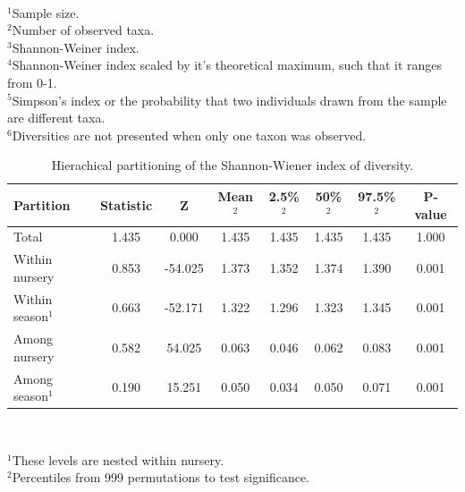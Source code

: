\documentclass[12pt]{article}
\begin{document}
\begin{table}[ht]
\\
\vspace{12pt}
\raggedright
$^{1}$Sample size.\\
$^{2}$Number of observed taxa.\\
$^{3}$Shannon-Weiner index.\\
$^{4}$Shannon-Weiner index scaled by it's theoretical maximum, such that it ranges from 0-1.\\
$^{5}$Simpson's index or the probability that two individuals drawn from the sample are different taxa.\\
$^{6}$Diversities are not presented when only one taxon was observed. \\
\end{table}


\begin{table}[ht]
\centering
\caption{Hierachical partitioning of the Shannon-Wiener index of diversity.} 
\label{tab:adipart}
\begin{tabular}{lccccccc}
  \hline
  \textbf{Partition} & \textbf{Statistic} & \textbf{Z} & \textbf{Mean}$^{2}$ & \textbf{2.5\%}$^{2}$ & \textbf{50\%}$^{2}$ & \textbf{97.5\%}$^{2}$ & \textbf{P-value} \\
  \hline
  Total & 1.435 & 0.000 & 1.435 & 1.435 & 1.435 & 1.435 & 1.000 \\
  Within nursery & 0.853 & -54.025 & 1.373 & 1.352 & 1.374 & 1.390 & 0.001 \\
  Within season$^{1}$ & 0.663 & -52.171 & 1.322 & 1.296 & 1.323 & 1.345 & 0.001 \\
  Among nursery & 0.582 & 54.025 & 0.063 & 0.046 & 0.062 & 0.083 & 0.001 \\
  Among season$^{1}$ & 0.190 & 15.251 & 0.050 & 0.034 & 0.050 & 0.071 & 0.001 \\
   \hline
\end{tabular}
\\
\vspace{12pt}
\raggedright
$^{1}$These levels are nested within nursery.\\
$^{2}$Percentiles from 999 permutations to test significance.
\end{table}
\end{document}
